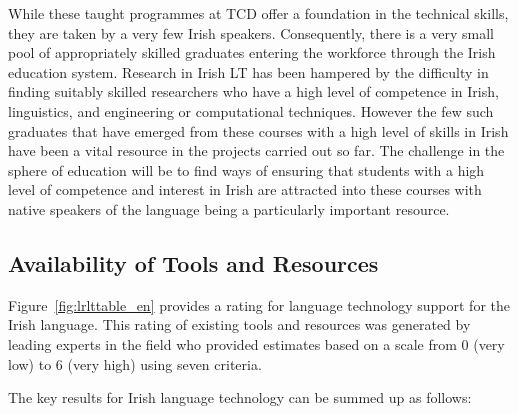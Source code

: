 \begin{multicols}{2}
While these taught programmes at TCD offer a foundation in the technical skills, they are taken by a very few Irish speakers. Consequently, there is a very small pool of appropriately skilled graduates entering the workforce through the Irish education system. Research in Irish LT has been hampered by the difficulty in finding suitably skilled researchers who have a high level of competence in Irish, linguistics, and engineering or computational techniques. However the few such graduates that have emerged from these courses with a high level of skills in Irish have been a vital resource in the projects carried out so far. The challenge in the sphere of education will be to find ways of ensuring that students with a high level of competence and interest in Irish are attracted into these courses with native speakers of the language being a particularly important resource. 

\subsection{Availability of Tools and Resources}

Figure~\ref{fig:lrlttable_en} provides a rating for language technology support for the Irish language. This rating of existing tools and resources was generated by leading experts in the field who provided estimates based on a scale from 0 (very low) to 6 (very high) using seven criteria.

The key results for Irish language technology can be summed up as follows:


\end{multicols}
